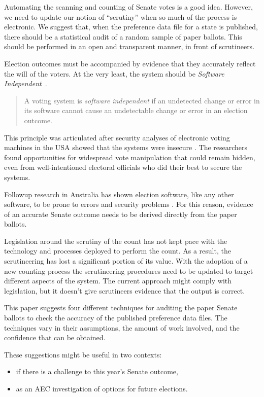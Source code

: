 \documentclass[10pt,a4paper]{article}
\begin{document}
Automating the scanning and counting of Senate votes is a good idea. However, we need to update our notion of  ``scrutiny'' when so much of the process is electronic.  We suggest that, when the preference data file for a state is published, there should be a statistical audit of a random sample of paper ballots.
This should be performed in an open and transparent manner, in front of scrutineers. 


Election outcomes must be accompanied by evidence that they accurately reflect the will of the voters. 
At the very least, the system should be \emph{Software Independent}~\cite{rivest2008notion}.
\begin{quote}
A voting system is \emph{software independent} if an undetected change or error in its software cannot cause an undetectable change or error in an election outcome.
\end{quote}

This principle was articulated after security analyses of electronic voting machines in the USA showed that the systems were insecure \cite{feldman2006security, kohno2004analysis, butler2008systemic, CAttbr}. The researchers found opportunities for widespread vote manipulation that could remain hidden, even from well-intentioned electoral officials who did their best to secure the systems.

Followup research in Australia  has shown election software, like any other software, to be prone to errors and security problems \cite{halderman2015new, CountingBug}.  For this reason, evidence of an accurate Senate outcome needs to be derived directly from the paper ballots.  

Legislation around the scrutiny of the count has not kept pace with the technology and processes deployed to perform the count. As a result, the scrutineering has lost a significant portion of its value. With the adoption of a new counting process the scrutineering procedures need to be updated to target different aspects of the system. The current approach might comply with legislation, but it doesn't give scrutineers evidence that the output is correct.

This paper suggests four different techniques for auditing the paper Senate ballots to check the accuracy of the published preference data files.  The techniques vary in their assumptions, the amount of work involved, and the confidence that can be obtained.

These suggestions might be useful in two contexts:
\begin{itemize}
\item if there is a challenge to this year's Senate outcome, 
\item as an AEC investigation of options for future elections.
\end{itemize}
\end{document}
